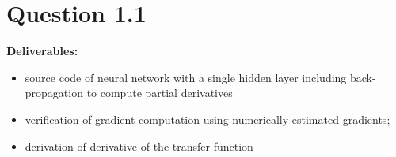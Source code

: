 \section*{Question 1.1}


\textbf{Deliverables: }

\begin{itemize}

	\item source code of neural network with a single hidden layer including back-propagation to compute partial derivatives

	\item verification of gradient computation using numerically estimated gradients;

	\item derivation of derivative of the transfer function
\end{itemize}
